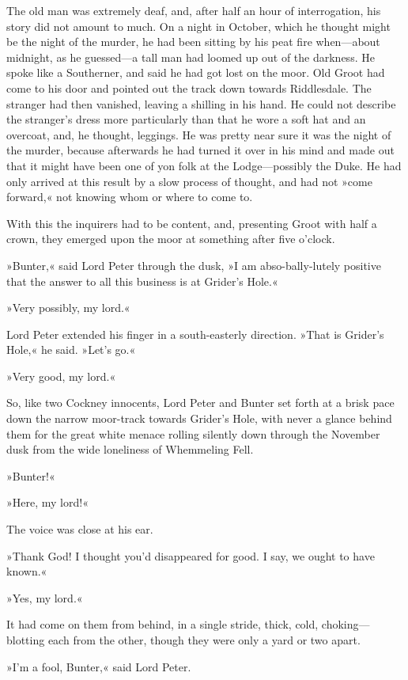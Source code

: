 The old man was extremely deaf, and, after half an hour of interrogation, his story did not amount to much. On a night in October, which he thought might be the night of the murder, he had been sitting by his peat fire when—about midnight, as he guessed—a tall man had loomed up out of the darkness. He spoke like a Southerner, and said he had got lost on the moor. Old Groot had come to his door and pointed out the track down towards Riddlesdale. The stranger had then vanished, leaving a shilling in his hand. He could not describe the stranger's dress more particularly than that he wore a soft hat and an overcoat, and, he thought, leggings. He was pretty near sure it was the night of the murder, because afterwards he had turned it over in his mind and made out that it might have been one of yon folk at the Lodge—possibly the Duke. He had only arrived at this result by a slow process of thought, and had not »come forward,« not knowing whom or where to come to.

With this the inquirers had to be content, and, presenting Groot with half a crown, they emerged upon the moor at something after five o'clock.

»Bunter,« said Lord Peter through the dusk, »I am abso-bally-lutely positive that the answer to all this business is at Grider's Hole.«

»Very possibly, my lord.«

Lord Peter extended his finger in a south-easterly direction. »That is Grider's Hole,« he said. »Let's go.«

»Very good, my lord.«

So, like two Cockney innocents, Lord Peter and Bunter set forth at a brisk pace down the narrow moor-track towards Grider's Hole, with never a glance behind them for the great white menace rolling silently down through the November dusk from the wide loneliness of Whemmeling Fell.

»Bunter!«

»Here, my lord!«

The voice was close at his ear.

»Thank God! I thought you'd disappeared for good. I say, we ought to have known.«

»Yes, my lord.«

It had come on them from behind, in a single stride, thick, cold, choking—blotting each from the other, though they were only a yard or two apart.

»I'm a fool, Bunter,« said Lord Peter.

